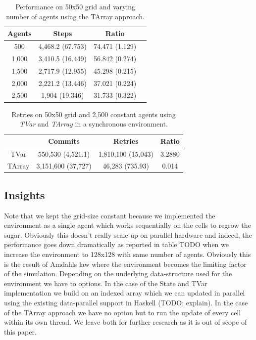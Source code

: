 \begin{table}
	\centering
  	\begin{tabular}{ c || c | c | c }
        Agents  & Steps            & Ratio          \\ \hline \hline 
    	500     & 4,468.2 (67.753) & 74.471 (1.129) \\ \hline
   		1,000   & 3,410.5 (16.449) & 56.842 (0.274) \\ \hline
   		1,500   & 2,717.9 (12.955) & 45.298 (0.215) \\ \hline
   		2,000   & 2,221.2 (13.446) & 37.021 (0.224) \\ \hline 
   		2,500   & 1,904 (19.346)   & 31.733 (0.322) \\ \hline 
   	\end{tabular}
  	
  	\caption{Performance on 50x50 grid and varying number of agents using the TArray approach.}
	\label{tab:tarray_results_agentsscale_time}
\end{table}

\begin{table}
	\centering
  	\begin{tabular}{ c || c | c | c }
               & Commits            & Retries              & Ratio \\ \hline \hline 
		TVar   & 550,530 (4,521.1)  & 1,810,100 (15,043) & 3.2880 \\ \hline   		
   		TArray & 3,151,600 (37,727) & 46,283 (735.93)      & 0.014 \\ \hline
   	\end{tabular}
  	
  	\caption{Retries on 50x50 grid and 2,500 constant agents using \textit{TVar} and \textit{TArray} in a synchronous environment.}
	\label{tab:tvartarray_results_agentsscale_retries}
\end{table}


\subsection{Insights}
Note that we kept the grid-size constant because we implemented the environment as a single agent which works sequentially on the cells to regrow the sugar. Obviously this doesn't really scale up on parallel hardware and indeed, the performance goes down dramatically as reported in table TODO when we increase the environment to 128x128 with same number of agents. Obviously this is the result of Amdahls law where the environment becomes the limiting factor of the simulation.
Depending on the underlying data-structure used for the environment we have to options. In the case of the State and TVar implementation we build on an indexed array which we can updated in parallel using the existing data-parallel support in Haskell (TODO: explain). In the case of the TArray approach we have no option but to run the update of every cell within its own thread. We leave both for further research as it is out of scope of this paper.

